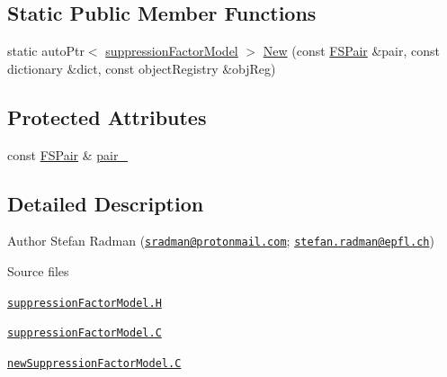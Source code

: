 \subsection*{Static Public Member Functions}
\begin{DoxyCompactItemize}
\item 
static auto\+Ptr$<$ \hyperlink{classFoam_1_1suppressionFactorModel}{suppression\+Factor\+Model} $>$ \hyperlink{classFoam_1_1suppressionFactorModel_a266f96bbd1f69712811a6f63047782e4}{New} (const \hyperlink{classFoam_1_1FSPair}{F\+S\+Pair} \&pair, const dictionary \&dict, const object\+Registry \&obj\+Reg)
\end{DoxyCompactItemize}
\subsection*{Protected Attributes}
\begin{DoxyCompactItemize}
\item 
const \hyperlink{classFoam_1_1FSPair}{F\+S\+Pair} \& \hyperlink{classFoam_1_1suppressionFactorModel_a587e19a1b4f4b498d2604d20c093a73b}{pair\+\_\+}
\end{DoxyCompactItemize}


\subsection{Detailed Description}
Author Stefan Radman (\href{mailto:sradman@protonmail.com}{\tt sradman@protonmail.\+com}; \href{mailto:stefan.radman@epfl.ch}{\tt stefan.\+radman@epfl.\+ch}) 

\label{_Description}%
 \begin{DoxyParagraph}{Source files}

\begin{DoxyItemize}
\item \href{../../../home/carlo/data/GeN-Foam/GeN-Foam_ffn/GeN-Foam/GeN-Foam/classes/thermalHydraulics/src/physicsModels/heatTransferModels/FSHeatTransferCoefficientModels/subModels/suppressionFactorModels/suppressionFactorModel.H}{\tt suppression\+Factor\+Model.\+H} 
\item \href{../../../home/carlo/data/GeN-Foam/GeN-Foam_ffn/GeN-Foam/GeN-Foam/classes/thermalHydraulics/src/physicsModels/heatTransferModels/FSHeatTransferCoefficientModels/subModels/suppressionFactorModels/suppressionFactorModel.C}{\tt suppression\+Factor\+Model.\+C} 
\item \href{../../../home/carlo/data/GeN-Foam/GeN-Foam_ffn/GeN-Foam/GeN-Foam/classes/thermalHydraulics/src/physicsModels/heatTransferModels/FSHeatTransferCoefficientModels/subModels/suppressionFactorModels/newSuppressionFactorModel.C}{\tt new\+Suppression\+Factor\+Model.\+C} 
\end{DoxyItemize}
\end{DoxyParagraph}


